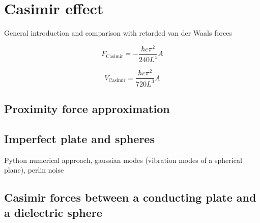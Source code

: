 \chapter{Casimir effect}\label{cha:casimir-effect}

General introduction and comparison with retarded van der Waals forces

\begin{equation}
  F_\mathrm{Casimir} = - \frac{\hbar c \pi^2}{240 L^4} A
\end{equation}

\begin{equation}
  V_\mathrm{Casimir} = \frac{\hbar c \pi^2}{720 L^3} A
\end{equation}


\section{Proximity force approximation}





\section{Imperfect plate and spheres}

Python numerical approach, gaussian modes (vibration modes of a spherical plane), perlin noise



\section{Casimir forces between a conducting plate and a dielectric sphere}
